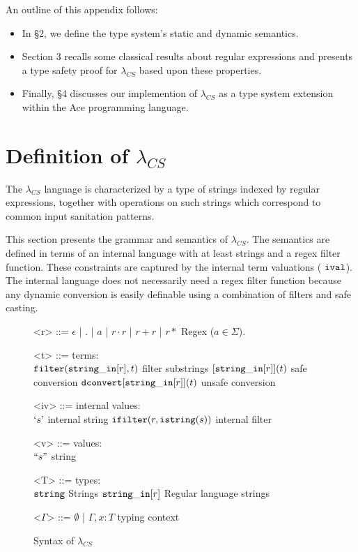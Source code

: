 \documentclass[10pt,preprint]{sigplanconf}
\theoremstyle{definition}
\newcommand{\strin}[1]{{\tt string\_in #1}}
\newcommand{\str}{ {\tt string} }
\newcommand{\istr}{ {\tt istring} }
\newcommand{\dconvert}{ {\tt dconvert} }
\newcommand{\filter}{ {\tt filter} }
\newcommand{\ival}{ \ {\tt ival} }
\newcommand{\istrf}[1]{`#1\textrm'} %
\newcommand{\strf}[1]{``#1"}
\newcommand{\lcs}{\lambda_{CS}}
\begin{document}
An outline of this appendix follows:

\begin{itemize}
  \item In \S 2, we define the type system's static and dynamic semantics.
  \item Section 3 recalls some classical results about regular expressions and presents a type safety proof for $\lcs$ based upon these properties.
  \item Finally, \S 4 discusses our implemention of $\lcs$ as a type system extension  within the Ace programming language.
\end{itemize}

\section{Definition of $\lcs$}

The $\lcs$ language is characterized by a type of strings indexed by regular
expressions, together with operations on such strings which correspond to common
input sanitation patterns.

This section presents the grammar and semantics of $\lcs$.
The semantics are defined in terms of an internal language with at least strings and a regex filter function.
These constraints are captured by the internal term valuations ($\ival$).
The internal language does not necessarily need a regex filter function because
any dynamic conversion is easily definable using a combination of filters and safe
casting.

%
%
\begin{figure}
\begin{grammar}
<r> ::= $\epsilon$ | $.$ | $a$ | $r \cdot r$ | $r + r$ | $r*$ \hfill Regex ($a \in \Sigma$).

<t> ::= 			\hfill terms: 					\\
$\filter(\strin[r],t)$ 		\hfill filter substrings			\alt
$[\strin[r]](t)$ \hfill safe conversion \alt
$\dconvert[\strin[r]](t)$ \hfill unsafe conversion

<iv> ::= 			\hfill internal values:					\\
$\istrf{s}$				\hfill internal string \alt
${\tt ifilter}(r, \istr(s))$ \hfill internal filter

<v> ::= \hfill values: \\
$\strf{s}$ \hfill string

<T> ::=				\hfill	types:					\\
$\str$  \hfill Strings \alt
$\strin[r]$				\hfill Regular language strings		

<$\Gamma$> ::=	$\emptyset$	 | $\Gamma,x:T$ \hfill typing context
\end{grammar}
\caption{Syntax of $\lcs$}
\label{fig:lcsSyntax}
\end{figure}
\end{document}
